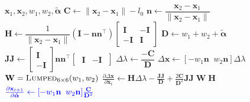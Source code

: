 \documentclass{article}
\newcommand{\pdc}[2]{\frac{\partial #1}{\partial #2}}
\newcommand{\blue}[1]{\textcolor{blue}{#1}}
\begin{document}
\begin{algorithm}[H]
\caption{Differentiated Distance Constraint Solve for 1-iteration XPBD Time Step}
\label{alg:diffXPBD_1iteration_distance_constraint}
\begin{algorithmic}[1]
\addtolength{\itemsep}{0.5ex}
{$\mathbf{x}_1, \mathbf{x}_2, w_1, w_2, \tilde{\boldsymbol{\alpha}}$}
    \State $\mathbf{C} \gets \| \mathbf{x}_2 - \mathbf{x}_1 \| - l_0$
    \State $\mathbf{n} \gets \dfrac{\mathbf{x}_2 - \mathbf{x}_1}{\| \mathbf{x}_2 - \mathbf{x}_1 \|}$
    \State $\mathbf{H} \gets 
        \dfrac{1}{\| \mathbf{x}_2 - \mathbf{x}_1 \|} (\mathbf{I} - 
        \mathbf{n}\mathbf{n}^\top)
        \begin{bmatrix}
            \mathbf{I} & -\mathbf{I} \\ -\mathbf{I} & \mathbf{I}
        \end{bmatrix}$
    \State $\mathbf{D} \gets w_1 + w_2 + \tilde{\boldsymbol{\alpha}}$ 
    \State $\mathbf{JJ} \gets 
        \begin{bmatrix} \mathbf{I} \\ -\mathbf{I} \end{bmatrix}
        \mathbf{n}\mathbf{n}^\top
        \begin{bmatrix} \;\mathbf{I} &-\mathbf{I} \; \end{bmatrix}
        $
    \State $\Delta \lambda \gets \dfrac{-\mathbf{C}}{\mathbf{D}}$
    \State $\Delta \mathbf{x} \gets 
    [-w_1\mathbf{n} \;\; w_2\mathbf{n}]\Delta \lambda$
    \State $\mathbf{W} = \textsc{Lumped}_{6\times6}(w_1, w_2)$
    \State $\pdc{\Delta \mathbf{x}}{\mathbf{x}_t} \gets
    \mathbf{H}\Delta\lambda - 
    \frac{\mathbf{JJ}}{\mathbf{D}} + \frac{2\mathbf{C}}{\mathbf{D}^{2}}\mathbf{JJ}\;\mathbf{W}\;\mathbf{H}$
    \State $\blue{\pdc{\mathbf{x}_{t+1}}{\tilde{\boldsymbol{\alpha}}} \gets [-w_1\mathbf{n} \;\; w_2\mathbf{n}] \frac{\mathbf{C}}{\mathbf{D}^{2}}}$
\EndFunction
\end{algorithmic}
\end{algorithm}
\end{document}
